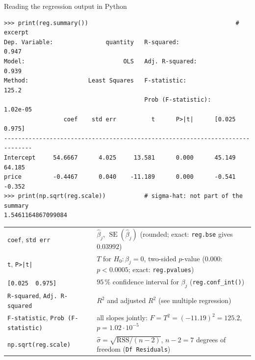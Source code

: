 \documentclass[aspectratio=169,11pt]{beamer}
\begin{document}
\begin{frame}[fragile]{Reading the regression output in Python}
  \vspace{-6pt}
\begin{lstlisting}[style=Pyout]
>>> print(reg.summary())                                          # excerpt
Dep. Variable:               quantity   R-squared:                       0.947
Model:                            OLS   Adj. R-squared:                  0.939
Method:                 Least Squares   F-statistic:                     125.2
                                        Prob (F-statistic):           1.02e-05
                 coef    std err          t      P>|t|      [0.025      0.975]
------------------------------------------------------------------------------
Intercept     54.6667      4.025     13.581      0.000      45.149      64.185
price         -0.4467      0.040    -11.189      0.000      -0.541      -0.352
>>> print(np.sqrt(reg.scale))           # sigma-hat: not part of the summary
1.5461164867099084
\end{lstlisting}
  \begin{center}
    \scriptsize
    \renewcommand{\arraystretch}{1.05}
    \begin{tabular}{@{}ll@{}}
      \toprule
      \texttt{coef}, \texttt{std err} & $\hat\beta_j$, $\operatorname{SE}(\hat\beta_j)$ \quad (rounded; exact: \texttt{reg.bse} gives $0.03992$)\\
      \texttt{t}, \texttt{P>|t|} & $T$ for $H_0:\beta_j=0$, two-sided $p$-value \quad ($0.000$: $p<0.0005$; exact: \texttt{reg.pvalues})\\
      \texttt{[0.025\ \ 0.975]} & $95\,\%$ confidence interval for $\beta_j$ \quad (\texttt{reg.conf\_int()})\\
      \texttt{R-squared}, \texttt{Adj.\ R-squared} & $R^2$ and adjusted $R^2$ (see multiple regression)\\
      \texttt{F-statistic}, \texttt{Prob (F-statistic)} & all slopes jointly: $F=T^2=(-11.19)^2=125.2$, $p=1.02\cdot10^{-5}$\\
      \texttt{np.sqrt(reg.scale)} & $\hat\sigma=\sqrt{\text{RSS}/(n-2)}$, $n-2=7$ degrees of freedom (\texttt{Df Residuals})\\
      \bottomrule
    \end{tabular}
  \end{center}
\end{frame}
\end{document}
